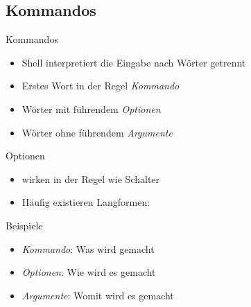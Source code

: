\documentclass[aspectratio=43]{beamer}
\begin{document}
\subsection{Kommandos}
\begin{frame} 

  \begin{block}{Kommandos} 
  \begin{itemize}
  \item Shell interpretiert die Eingabe nach Wörter getrennt
  \item Erstes Wort in der Regel \textit{Kommando}
  \item Wörter mit führendem \co{-} \textit{Optionen}
  \item Wörter ohne führendem \co{-} \textit{Argumente}
  \end{itemize}
  \end{block}

  \begin{block}{Optionen}
  \begin{itemize}
  \item {} wirken in der Regel wie Schalter
  \item Häufig existieren Langformen:  
  \end{itemize}
  \end{block}

\end{frame}



\begin{frame} 

  \begin{exampleblock}{Beispiele} 
  \begin{itemize}
    \item  \textit{Kommando}: Was wird gemacht
    \item \textit{Optionen}: Wie wird es gemacht 
    \item \textit{Argumente}: Womit wird es gemacht
  \end{itemize}
  \end{exampleblock}

\end{frame}
\end{document}
